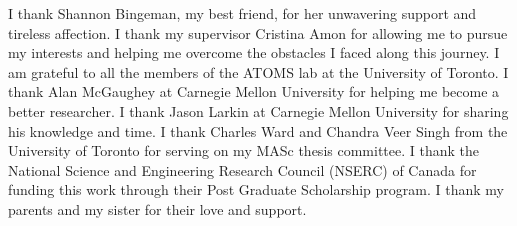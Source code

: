 \documentclass[12pt,doublespaced]{ut-thesis}
\begin{document}
\begin{preliminary}

\begin{acknowledgements}
\indent I thank Shannon Bingeman, my best friend, for her unwavering support and tireless affection.
I thank my supervisor Cristina Amon for allowing me to pursue my interests and helping me overcome the obstacles I faced along this journey. I am grateful to all the members of the ATOMS lab at the University of Toronto.
I thank Alan McGaughey at Carnegie Mellon University for helping me become a better researcher. I thank Jason Larkin at Carnegie Mellon University for sharing his knowledge and time.
I thank Charles Ward and Chandra Veer Singh from the University of Toronto for serving on my MASc thesis committee.
I thank the National Science and Engineering Research Council (NSERC) of Canada for funding this work through their Post Graduate Scholarship program.
I thank my parents and my sister for their love and support.
\end{acknowledgements}
\newpage
\begin{singlespace}
\tableofcontents
\newpage
\listoftables
\newpage
\listoffigures
\end{singlespace}

\newpage


\end{preliminary}


\end{document}
